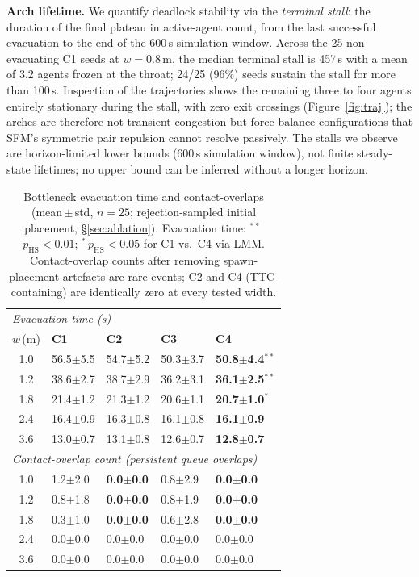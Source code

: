 \documentclass[a4paper,twoside]{article}
\begin{document}
\textbf{Arch lifetime.}
We quantify deadlock stability via the \emph{terminal stall}: the duration of the final plateau in active-agent count, from the last successful evacuation to the end of the 600\,s simulation window. Across the 25 non-evacuating C1 seeds at $w=0.8$\,m, the median terminal stall is 457\,s with a mean of 3.2 agents frozen at the throat; 24/25 (96\%) seeds sustain the stall for more than 100\,s. Inspection of the trajectories shows the remaining three to four agents entirely stationary during the stall, with zero exit crossings (Figure~\ref{fig:traj}); the arches are therefore not transient congestion but force-balance configurations that SFM's symmetric pair repulsion cannot resolve passively. The stalls we observe are horizon-limited lower bounds (600\,s simulation window), not finite steady-state lifetimes; no upper bound can be inferred without a longer horizon.

\begin{table}[h]
\caption{Bottleneck evacuation time and contact-overlaps (mean\,$\pm$\,std, $n=25$; rejection-sampled initial placement, \S\ref{sec:ablation}). Evacuation time: $^{**}$\,$p_{\mathrm{HS}}\!<\!0.01$; $^{*}$\,$p_{\mathrm{HS}}\!<\!0.05$ for C1 vs.\ C4 via LMM. Contact-overlap counts after removing spawn-placement artefacts are rare events; C2 and C4 (TTC-containing) are identically zero at every tested width.}\label{tab:bottleneck}
\centering\scriptsize
\setlength{\tabcolsep}{3pt}
\begin{tabular}{@{}cllll@{}}
\toprule
\multicolumn{5}{l}{\textit{Evacuation time (s)}} \\
$w$\,(m) & \textbf{C1} & \textbf{C2} & \textbf{C3} & \textbf{C4} \\
\midrule
1.0 & 56.5$\pm$5.5 & 54.7$\pm$5.2 & 50.3$\pm$3.7 & \textbf{50.8$\pm$4.4}$^{**}$ \\
1.2 & 38.6$\pm$2.7 & 38.7$\pm$2.9 & 36.2$\pm$3.1 & \textbf{36.1$\pm$2.5}$^{**}$ \\
1.8 & 21.4$\pm$1.2 & 21.3$\pm$1.2 & 20.6$\pm$1.1 & \textbf{20.7$\pm$1.0}$^{*}$ \\
2.4 & 16.4$\pm$0.9 & 16.3$\pm$0.8 & 16.1$\pm$0.8 & \textbf{16.1$\pm$0.9} \\
3.6 & 13.0$\pm$0.7 & 13.1$\pm$0.8 & 12.6$\pm$0.7 & \textbf{12.8$\pm$0.7} \\
\midrule
\multicolumn{5}{l}{\textit{Contact-overlap count (persistent queue overlaps)}} \\
1.0 & 1.2$\pm$2.0 & \textbf{0.0$\pm$0.0} & 0.8$\pm$2.9 & \textbf{0.0$\pm$0.0} \\
1.2 & 0.8$\pm$1.8 & \textbf{0.0$\pm$0.0} & 0.8$\pm$1.9 & \textbf{0.0$\pm$0.0} \\
1.8 & 0.3$\pm$1.0 & \textbf{0.0$\pm$0.0} & 0.6$\pm$2.8 & \textbf{0.0$\pm$0.0} \\
2.4 & 0.0$\pm$0.0 & 0.0$\pm$0.0 & 0.0$\pm$0.0 & 0.0$\pm$0.0 \\
3.6 & 0.0$\pm$0.0 & 0.0$\pm$0.0 & 0.0$\pm$0.0 & 0.0$\pm$0.0 \\
\bottomrule
\end{tabular}
\end{table}
\end{document}
